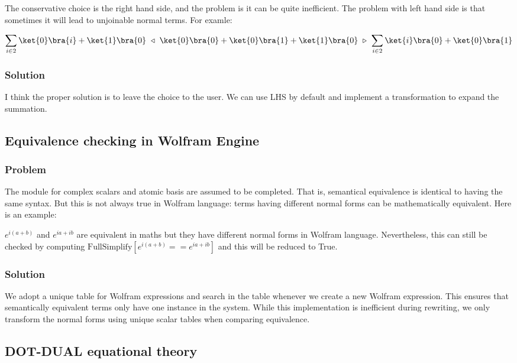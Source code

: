 The conservative choice is the right hand side, and the problem is it can be quite inefficient. The problem with left hand side is that sometimes it will lead to unjoinable normal terms. For examle:

$$
\sum_{i \in 2} \ket{0}\bra{i} + \ket{1}\bra{0} \reducefrom \ket{0}\bra{0} + \ket{0}\bra{1} + \ket{1}\bra{0} \reduce \sum_{i \in 2} \ket{i}\bra{0} + \ket{0}\bra{1}
$$

\subsubsection*{Solution}
I think the proper solution is to leave the choice to the user. We can use LHS by default and implement a transformation to expand the summation.

\subsection{Equivalence checking in Wolfram Engine}

\subsubsection*{Problem}

The module for complex scalars and atomic basis are assumed to be completed. That is, semantical equivalence is identical to having the same syntax. But this is not always true in Wolfram language: terms having different normal forms can be mathematically equivalent. Here is an example:

$ e^{i(a+b)} $ and $ e^{ia + ib} $ are equivalent in maths but they have different normal forms in Wolfram language. Nevertheless, this can still be checked by computing $\text{FullSimplify}[e^{i(a+b)} == e^{ia + ib}]$ and this will be reduced to True.

\subsubsection*{Solution}

We adopt a unique table for Wolfram expressions and search in the table whenever we create a new Wolfram expression. This ensures that semantically equivalent terms only have one instance in the system. While this implementation is inefficient during rewriting, we only transform the normal forms using unique scalar tables when comparing equivalence.

\subsection{\textsf{DOT-DUAL} equational theory}


